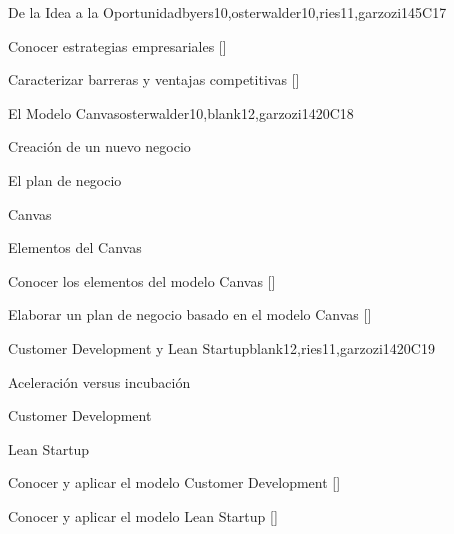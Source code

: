 \begin{syllabus}
\begin{unit}{}{De la Idea a la Oportunidad}{byers10,osterwalder10,ries11,garzozi14}{5}{C17}
\begin{learningoutcomes} 
    \item Conocer estrategias empresariales  [\Familiarity]
    \item Caracterizar barreras y ventajas competitivas   [\Familiarity]
\end{learningoutcomes} 
\end{unit}
   
   \begin{unit}{}{El Modelo Canvas}{osterwalder10,blank12,garzozi14}{20}{C18}
      \begin{topics}
         \item Creación de un nuevo negocio
         \item El plan de negocio 
         \item Canvas
         \item Elementos del Canvas
      \end{topics}
   
     \begin{learningoutcomes} 
         \item Conocer los elementos del modelo Canvas  [\Usage]
         \item Elaborar un plan de negocio basado en el modelo Canvas  [\Usage]
       \end{learningoutcomes} 
   \end{unit}
   
   \begin{unit}{}{Customer Development y Lean Startup}{blank12,ries11,garzozi14}{20}{C19}
      \begin{topics}
         \item Aceleración versus incubación  
         \item Customer Development
         \item Lean Startup 
      \end{topics}
   
      \begin{learningoutcomes} 
         \item Conocer y aplicar el modelo Customer Development  [\Usage]
         \item Conocer y aplicar el modelo Lean Startup  [\Usage]
       \end{learningoutcomes} 
   \end{unit}
   

\end{syllabus}
